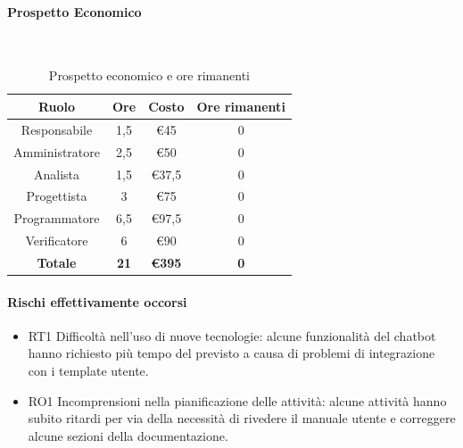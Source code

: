 \documentclass{article}
\begin{document}
            \paragraph{Prospetto Economico}\mbox{}\\
            \begin{table}[H]
                \centering
                \begin{tabular}{|c|c|c|c|}
                \hline
                \textbf{Ruolo}  & \textbf{Ore}  & \textbf{Costo}      & \textbf{Ore rimanenti} \\ \hline
                Responsabile    & 1,5           & €45                 & 0                      \\ \hline
                Amministratore  & 2,5           & €50                 & 0                      \\ \hline
                Analista        & 1,5           & €37,5               & 0                      \\ \hline
                Progettista     & 3             & €75                 & 0                      \\ \hline
                Programmatore   & 6,5           & €97,5               & 0                      \\ \hline
                Verificatore    & 6             & €90                 & 0                      \\ \hline
                \textbf{Totale} & \textbf{21}   & \textbf{\euro395}   & \textbf{0}            \\ \hline
                \end{tabular}
                \caption{Prospetto economico e ore rimanenti}
            \end{table}
            
            \paragraph{Rischi effettivamente occorsi}  
            \begin{itemize}  
                \item RT1 Difficoltà nell’uso di nuove tecnologie: alcune funzionalità del chatbot hanno richiesto più tempo del previsto a causa di problemi di integrazione con i template utente.  
                \item RO1 Incomprensioni nella pianificazione delle attività: alcune attività hanno subito ritardi per via della necessità di rivedere il manuale utente e correggere alcune sezioni della documentazione.  
            \end{itemize}  
            
\end{document}
